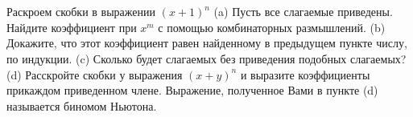 \documentclass[a4paper,10pt]{article}%
\begin{document}
%
\section{}%
\label{sec:}%
Раскроем скобки в выражении $(x + 1)^n$
(a) Пусть все слагаемые приведены. Найдите коэффициент при $x^m$ с помощью комбинаторных размышлений.
(b) Докажите, что этот коэффициент равен найденному в предыдущем пункте числу, по индукции.
(c) Сколько будет слагаемых без приведения подобных слагаемых?
(d) Расскройте скобки у выражения $(x + y)^n$ и выразите коэффициенты прикаждом приведенном члене.
Выражение, полученное Вами в пункте (d) называется биномом Ньютона.%
%
\iffalse%
Автор: Павел Минаев%
Дата: 07{-}10{-}2017%
Название: None%
Подсказка: \textbackslash{}\textbackslash{}%
nan%
\fi

%
\end{document}
